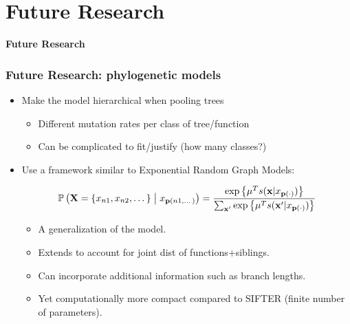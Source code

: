 \documentclass[aspectratio=169, 9pt]{beamer}
\begin{document}
\section{Future Research}

\begin{frame}[c]
\textcolor{uscgold}{
\Large {\bf Future Research}
}
\end{frame}

\begin{frame}
\frametitle{Future Research: phylogenetic models}

\begin{itemize}
\item Make the model hierarchical when pooling trees\pause
\begin{itemize}
\item Different mutation rates per class of tree/function
\item Can be complicated to fit/justify (how many classes?)
\end{itemize}\pause
\item Use a framework similar to Exponential Random Graph Models:\pause

$$
\Prcond{\Ann=\{\ann{n1}, \ann{n2},\dots\}}{\ann{\parent{n1, \dots}}} = \frac{\exp{\mu^{T} s(\mathbf{x}|\ann{\parent{\cdot}})}}{\sum_{\mathbf{x}'}\exp{\mu^{T} s(\mathbf{x}'|\ann{\parent{\cdot}})}}
$$

\begin{itemize}
\item A generalization of the model.
\item Extends to account for joint dist of functions+siblings.
\item Can incorporate additional information such as branch lengths.
\item Yet computationally more compact compared to SIFTER (finite number of parameters).
\end{itemize}
\end{itemize}


\end{frame}

\end{document}
